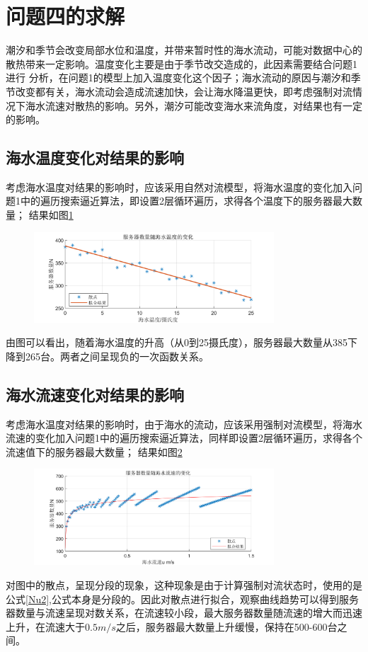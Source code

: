 \documentclass{article}
\begin{document}
   \section{问题四的求解}
   
    潮汐和季节会改变局部水位和温度，并带来暂时性的海水流动，可能对数据中心的散热带来一定影响。温度变化主要是由于季节改交造成的，此因素需要结合问题1进行
    分析，在问题1的模型上加入温度变化这个因子；海水流动的原因与潮汐和季节改变都有关，海水流动会造成流速加快，会让海水降温更快，即考虑强制对流情况下海水流速对散热的影响。另外，潮汐可能改变海水来流角度，对结果也有一定的影响。
    \subsection{海水温度变化对结果的影响}
    考虑海水温度对结果的影响时，应该采用自然对流模型，将海水温度的变化加入问题1中的遍历搜索逼近算法，即设置2层循环遍历，求得各个温度下的服务器最大数量；
    结果如图\ref{fwqslswd}
    \begin{figure}[H]
    	\centering
    	\includegraphics[width=0.8\textwidth]{img/服务器数量随温度变化曲线及拟合结果.png}
    	\label{fwqslswd}
    \end{figure}
    由图可以看出，随着海水温度的升高（从0到25摄氏度），服务器最大数量从385下降到265台。两者之间呈现负的一次函数关系。
    
    
    \subsection{海水流速变化对结果的影响}
    考虑海水温度对结果的影响时，由于海水的流动，应该采用强制对流模型，将海水流速的变化加入问题1中的遍历搜索逼近算法，同样即设置2层循环遍历，求得各个流速值下的服务器最大数量；
    结果如图\ref{fwqsls}
    \begin{figure}[H]
    	\centering
    	\includegraphics[width=0.8\textwidth]{img/服务器数量随流速变化曲线及拟合结果2.png}
    	\label{fwqsls}
    \end{figure}
   对图中的散点，呈现分段的现象，这种现象是由于计算强制对流状态时，使用的是公式\eqref{Nu2},公式本身是分段的。因此对散点进行拟合，观察曲线趋势可以得到服务器数量与流速呈现对数关系，在流速较小段，最大服务器数量随流速的增大而迅速上升，在流速大于$0.5m/s$之后，服务器最大数量上升缓慢，保持在500-600台之间。
   
\end{document}
